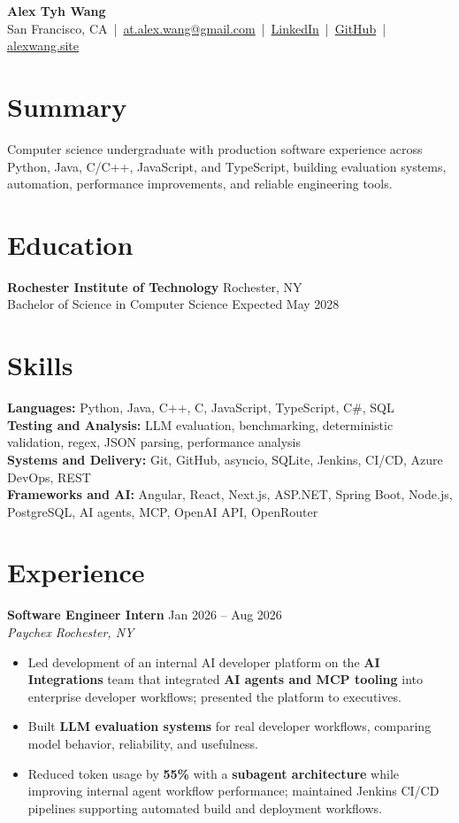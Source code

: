 \documentclass[10pt,letterpaper]{article}
\newcommand{\resumeRole}[4]{%
  \textbf{#1} \hfill #2\\
  \textit{#3} \hfill \textit{#4}
}
\newcommand{\majorGap}{\vspace{1pt plus 2fill}}
\begin{document}
\begin{center}
{\Large \textbf{Alex Tyh Wang}}\\
San Francisco, CA \,|\, \href{mailto:at.alex.wang@gmail.com}{at.alex.wang@gmail.com} \,|\, \href{https://www.linkedin.com/in/alex-tyh-wang/}{LinkedIn} \,|\, \href{https://github.com/alextyhwang}{GitHub} \,|\, \href{https://alexwang.site}{alexwang.site}
\end{center}

\section*{Summary}
Computer science undergraduate with production software experience across Python, Java, C/C++, JavaScript, and TypeScript, building evaluation systems, automation, performance improvements, and reliable engineering tools.

\majorGap
\section*{Education}
\textbf{Rochester Institute of Technology} \hfill Rochester, NY\\
Bachelor of Science in Computer Science \hfill Expected May 2028

\majorGap
\section*{Skills}
\textbf{Languages:} Python, Java, C++, C, JavaScript, TypeScript, C\#, SQL\\
\textbf{Testing and Analysis:} LLM evaluation, benchmarking, deterministic validation, regex, JSON parsing, performance analysis\\
\textbf{Systems and Delivery:} Git, GitHub, asyncio, SQLite, Jenkins, CI/CD, Azure DevOps, REST\\
\textbf{Frameworks and AI:} Angular, React, Next.js, ASP.NET, Spring Boot, Node.js, PostgreSQL, AI agents, MCP, OpenAI API, OpenRouter

\majorGap
\section*{Experience}
\resumeRole{Software Engineer Intern}{Jan 2026 -- Aug 2026}{Paychex}{Rochester, NY}
\begin{itemize}
  \item Led development of an internal AI developer platform on the \textbf{AI Integrations} team that integrated \textbf{AI agents and MCP tooling} into enterprise developer workflows; presented the platform to executives.
  \item Built \textbf{LLM evaluation systems} for real developer workflows, comparing model behavior, reliability, and usefulness.
  \item Reduced token usage by \textbf{55\%} with a \textbf{subagent architecture} while improving internal agent workflow performance; maintained Jenkins CI/CD pipelines supporting automated build and deployment workflows.
\end{itemize}
\end{document}

